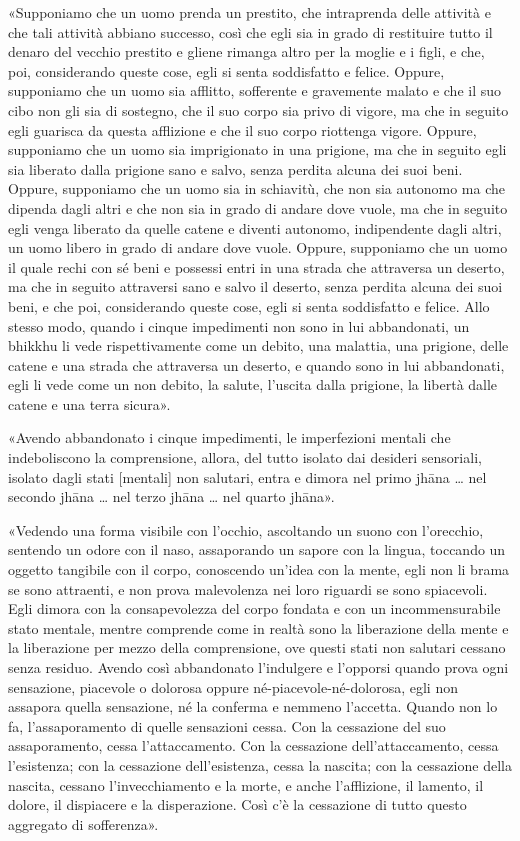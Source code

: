 «Supponiamo che un uomo prenda un prestito, che intraprenda delle
attività e che tali attività abbiano successo, così che egli sia in
grado di restituire tutto il denaro del vecchio prestito e gliene
rimanga altro per la moglie e i figli, e che, poi, considerando queste
cose, egli si senta soddisfatto e felice. Oppure, supponiamo che un uomo
sia afflitto, sofferente e gravemente malato e che il suo cibo non gli
sia di sostegno, che il suo corpo sia privo di vigore, ma che in seguito
egli guarisca da questa afflizione e che il suo corpo riottenga vigore.
Oppure, supponiamo che un uomo sia imprigionato in una prigione, ma che
in seguito egli sia liberato dalla prigione sano e salvo, senza perdita
alcuna dei suoi beni. Oppure, supponiamo che un uomo sia in schiavitù,
che non sia autonomo ma che dipenda dagli altri e che non sia in grado
di andare dove vuole, ma che in seguito egli venga liberato da quelle
catene e diventi autonomo, indipendente dagli altri, un uomo libero in
grado di andare dove vuole. Oppure, supponiamo che un uomo il quale
rechi con sé beni e possessi entri in una strada che attraversa un
deserto, ma che in seguito attraversi sano e salvo il deserto, senza
perdita alcuna dei suoi beni, e che poi, considerando queste cose, egli
si senta soddisfatto e felice. Allo stesso modo, quando i cinque
impedimenti non sono in lui abbandonati, un bhikkhu li vede
rispettivamente come un debito, una malattia, una prigione, delle catene
e una strada che attraversa un deserto, e quando sono in lui
abbandonati, egli li vede come un non debito, la salute, l’uscita dalla
prigione, la libertà dalle catene e una terra sicura».




«Avendo abbandonato i cinque impedimenti, le imperfezioni mentali che
indeboliscono la comprensione, allora, del tutto isolato dai desideri
sensoriali, isolato dagli stati [mentali] non salutari, entra e dimora
nel primo jhāna … nel secondo jhāna … nel terzo jhāna … nel quarto
jhāna».


«Vedendo una forma visibile con l’occhio, ascoltando un suono con
l’orecchio, sentendo un odore con il naso, assaporando un sapore con la
lingua, toccando un oggetto tangibile con il corpo, conoscendo un’idea
con la mente, egli non li brama se sono attraenti, e non prova
malevolenza nei loro riguardi se sono spiacevoli. Egli dimora con la
consapevolezza del corpo fondata e con un incommensurabile stato
mentale, mentre comprende come in realtà sono la liberazione della mente
e la liberazione per mezzo della comprensione, ove questi stati non
salutari cessano senza residuo. Avendo così abbandonato l’indulgere e
l’opporsi quando prova ogni sensazione, piacevole o dolorosa oppure
né-piacevole-né-dolorosa, egli non assapora quella sensazione, né la
conferma e nemmeno l’accetta. Quando non lo fa, l’assaporamento di
quelle sensazioni cessa. Con la cessazione del suo assaporamento, cessa
l’attaccamento. Con la cessazione dell’attaccamento, cessa l’esistenza;
con la cessazione dell’esistenza, cessa la nascita; con la cessazione
della nascita, cessano l’invecchiamento e la morte, e anche
l’afflizione, il lamento, il dolore, il dispiacere e la disperazione.
Così c’è la cessazione di tutto questo aggregato di sofferenza».


